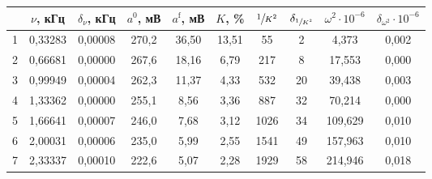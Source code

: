\begin{table}
\centering
\label{tbl:7}
\begin{tabular}{|c|c|c|c|c|c|c|c|c|c|}
\hline
 & $\nu$, кГц & $\delta_{\nu}$, кГц & $a^0$, мВ & $a^{\mathrm{f}}$, мВ & $K$, \% & $\sfrac{1}{K^2}$ & $\delta_{\sfrac{1}{K^2}}$ & $\omega^2 \cdot 10^{-6}$ & $\delta_{\omega^2} \cdot 10^{-6}$ \\
\hline
1 & 0,33283 & 0,00008 & 270,2 & 36,50 & 13,51 & 55 & 2 & 4,373 & 0,002 \\
\cline{1-10}
2 & 0,66681 & 0,00000 & 267,6 & 18,16 & 6,79 & 217 & 8 & 17,553 & 0,000 \\
\cline{1-10}
3 & 0,99949 & 0,00004 & 262,3 & 11,37 & 4,33 & 532 & 20 & 39,438 & 0,003 \\
\cline{1-10}
4 & 1,33362 & 0,00000 & 255,1 & 8,56 & 3,36 & 887 & 32 & 70,214 & 0,000 \\
\cline{1-10}
5 & 1,66641 & 0,00007 & 246,0 & 7,68 & 3,12 & 1026 & 34 & 109,629 & 0,010 \\
\cline{1-10}
6 & 2,00031 & 0,00006 & 235,0 & 5,99 & 2,55 & 1541 & 49 & 157,963 & 0,010 \\
\cline{1-10}
7 & 2,33337 & 0,00010 & 222,6 & 5,07 & 2,28 & 1929 & 58 & 214,946 & 0,018 \\
\cline{1-10}
\hline
\end{tabular}
\end{table}

